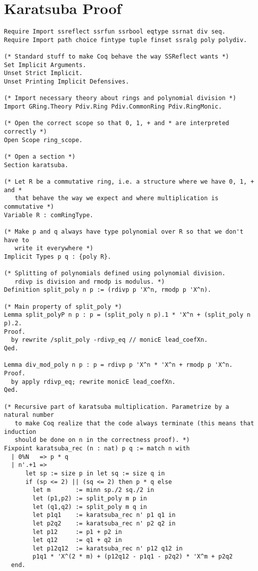 \documentclass[a4paper]{article}
\begin{document}
\section{Karatsuba Proof}
\begin{verbatim}
Require Import ssreflect ssrfun ssrbool eqtype ssrnat div seq.
Require Import path choice fintype tuple finset ssralg poly polydiv.

(* Standard stuff to make Coq behave the way SSReflect wants *)
Set Implicit Arguments.
Unset Strict Implicit.
Unset Printing Implicit Defensives.

(* Import necessary theory about rings and polynomial division *)
Import GRing.Theory Pdiv.Ring Pdiv.CommonRing Pdiv.RingMonic.

(* Open the correct scope so that 0, 1, + and * are interpreted correctly *)
Open Scope ring_scope.

(* Open a section *)
Section karatsuba.

(* Let R be a commutative ring, i.e. a structure where we have 0, 1, + and *
   that behave the way we expect and where multiplication is commutative *)
Variable R : comRingType.

(* Make p and q always have type polynomial over R so that we don't have to
   write it everywhere *)
Implicit Types p q : {poly R}.

(* Splitting of polynomials defined using polynomial division.
   rdivp is division and rmodp is modulus. *)
Definition split_poly n p := (rdivp p 'X^n, rmodp p 'X^n).

(* Main property of split_poly *)
Lemma split_polyP n p : p = (split_poly n p).1 * 'X^n + (split_poly n p).2.
Proof.
  by rewrite /split_poly -rdivp_eq // monicE lead_coefXn.
Qed.

Lemma div_mod_poly n p : p = rdivp p 'X^n * 'X^n + rmodp p 'X^n.
Proof.
  by apply rdivp_eq; rewrite monicE lead_coefXn.
Qed.

(* Recursive part of karatsuba multiplication. Parametrize by a natural number
   to make Coq realize that the code always terminate (this means that induction
   should be done on n in the correctness proof). *)
Fixpoint karatsuba_rec (n : nat) p q := match n with
  | 0%N   => p * q
  | n'.+1 =>
      let sp := size p in let sq := size q in
      if (sp <= 2) || (sq <= 2) then p * q else
        let m       := minn sp./2 sq./2 in
        let (p1,p2) := split_poly m p in
        let (q1,q2) := split_poly m q in
        let p1q1    := karatsuba_rec n' p1 q1 in
        let p2q2    := karatsuba_rec n' p2 q2 in
        let p12     := p1 + p2 in
        let q12     := q1 + q2 in
        let p12q12  := karatsuba_rec n' p12 q12 in
        p1q1 * 'X^(2 * m) + (p12q12 - p1q1 - p2q2) * 'X^m + p2q2
  end.


\end{verbatim}
\end{document}
